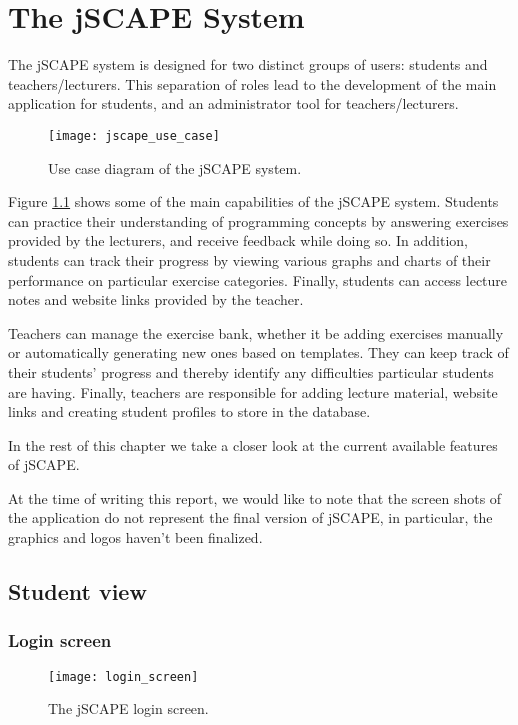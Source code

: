 \chapter{The jSCAPE System}

The jSCAPE system is designed for two distinct groups of users: students and teachers/lecturers. This separation of roles lead to the development of the main application for students, and an administrator tool for teachers/lecturers.

\begin{figure}[H]
\centering
\texttt{[image: jscape\_use\_case]}
\caption{Use case diagram of the jSCAPE system.}
\label{fig:jscape_use_case}
\end{figure}

Figure \ref{fig:jscape_use_case} shows some of the main capabilities of the jSCAPE system. Students can practice their understanding of programming concepts by answering exercises provided by the lecturers, and receive feedback while doing so. In addition, students can track their progress by viewing various graphs and charts of their performance on particular exercise categories. Finally, students can access lecture notes and website links provided by the teacher. \newline

Teachers can manage the exercise bank, whether it be adding exercises manually or automatically generating new ones based on templates. They can keep track of their students' progress and thereby identify any difficulties particular students are having. Finally, teachers are responsible for adding lecture material, website links and creating student profiles to store in the database.\newline

In the rest of this chapter we take a closer look at the current available features of jSCAPE.\newline

At the time of writing this report, we would like to note that the screen shots of the application do not represent the final version of jSCAPE, in particular, the graphics and logos haven't been finalized.

\section{Student view}

\subsection{Login screen}
\begin{figure}[H]
\centering
\texttt{[image: login\_screen]}
\caption{The jSCAPE login screen.}
\label{fig:login_screen}
\end{figure}

